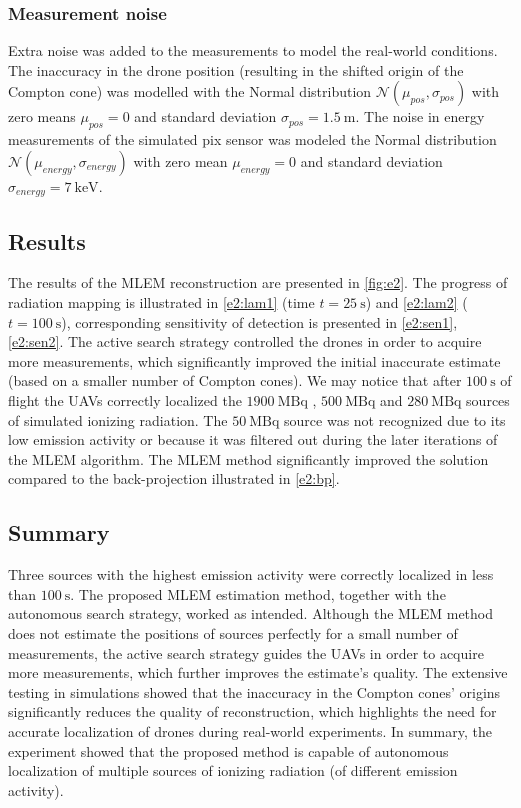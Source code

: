 \subsubsection{Measurement noise}
Extra noise was added to the measurements to model the real-world conditions.
The inaccuracy in the drone position (resulting in the shifted origin of the Compton cone) was modelled with the Normal distribution $\mathcal{N}(\mu_{pos}, \sigma_{pos})$ with zero means $\mu_{pos} = 0$ and standard deviation $\sigma_{pos} = \SI{1.5}{\meter}$. 
The noise in energy measurements of the simulated \ac{pix} sensor was modeled the Normal distribution $\mathcal{N}(\mu_{energy}, \sigma_{energy})$ with zero mean $\mu_{energy} = 0$ and standard deviation $\sigma_{energy} = \SI{7}{\kilo\electronvolt}$.

\subsection{Results}
The results of the \ac{MLEM} reconstruction are presented in \autoref{fig:e2}.
The progress of radiation mapping is illustrated in \autoref{e2:lam1} (time $t = \SI{25}{\second}$) and \autoref{e2:lam2} ($t = \SI{100}{\second}$), corresponding sensitivity of detection is presented in \autoref{e2:sen1}, \autoref{e2:sen2}.
The active search strategy controlled the drones in order to acquire more measurements, which significantly improved the initial inaccurate estimate (based on a smaller number of Compton cones).
We may notice that after $\SI{100}{\second}$ of flight the \ac{UAV}s correctly localized the $\SI{1900}{\mega\becquerel}$ , $\SI{500}{\mega\becquerel}$ and $\SI{280}{\mega\becquerel}$ sources of simulated ionizing radiation.
The $\SI{50}{\mega\becquerel}$ source was not recognized due to its low emission activity or because it was filtered out during the later iterations of the \ac{MLEM} algorithm.
The \ac{MLEM} method significantly improved the solution compared to the back-projection illustrated in \autoref{e2:bp}.

\subsection{Summary}
Three sources with the highest emission activity were correctly localized in less than $\SI{100}{\second}$.
The proposed \ac{MLEM} estimation method, together with the autonomous search strategy, worked as intended.
Although the \ac{MLEM} method does not estimate the positions of sources perfectly for a small number of measurements, the active search strategy guides the \ac{UAV}s in order to acquire more measurements, which further improves the estimate's quality.
The extensive testing in simulations showed that the inaccuracy in the Compton cones' origins significantly reduces the quality of reconstruction, which highlights the need for accurate localization of drones during real-world experiments.
In summary, the experiment showed that the proposed method is capable of autonomous localization of multiple sources of ionizing radiation (of different emission activity).




